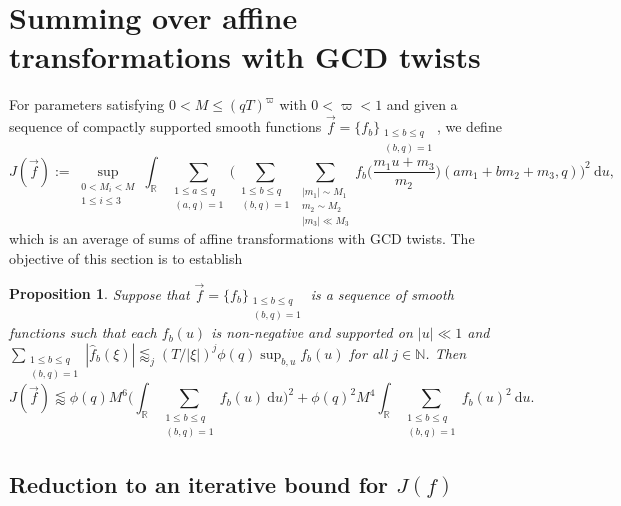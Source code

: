 \documentclass[12pt]{amsart}
\newtheorem{proposition}[theorem]{Proposition}
\theoremstyle{definition}
\theoremstyle{plain}
\theoremstyle{remark}
\numberwithin{equation}{section}
\numberwithin{theorem}{section}
\numberwithin{equation}{section}
\begin{document}
	\section{Summing over affine transformations with GCD twists}\label{sumoaffgcd}
	For parameters satisfying $0<M \leq (qT)^{\varpi}$ with $0<\varpi <1$ and given a sequence of compactly supported smooth functions $\overrightarrow{f}=\{f_{b}\}_{\substack{1 \leq b \leq q \\ (b, q)=1}}$, we define 
	\[J(\overrightarrow{f}):= \sup_{\substack{0<M_{i}< M \\ 1 \leq i \leq 3}} \int_{\mathbb{R}}\sum_{\substack{1 \leq a \leq q \\ (a, q)=1}}
	\bigg(\sum_{\substack{1 \leq b \leq q \\ (b, q)=1}}\sum_{\substack{|m_{1}|\sim M_{1} \\ m_{2}\sim M_{2} \\ |m_{3}|\ll M_{3}}}f_{b}\bigg(\frac{m_{1}u+m_{3}}{m_{2}}\bigg)(am_{1}+bm_{2}+m_{3}, q)\bigg)^{2} \:\mathrm{d}u,\]
	which is an average of sums of affine transformations with GCD twists. The objective of this section is to establish
	\begin{proposition}\label{bsoat}
		Suppose that $\overrightarrow{f}=\{f_{b}\}_{\substack{1 \leq b \leq q \\ (b, q)=1}}$ is a sequence of smooth functions such that each $f_{b}(u)$ is non-negative and supported on $|u|\ll 1$ and $\sum_{\substack{1 \leq b \leq q \\ (b, q)=1}}|\hat{f}_{b}(\xi)| \lessapprox_{j} (T/|\xi|)^{j}\phi(q)\sup_{b,u}f_{b}(u) $ for all $j \in \mathbb{N}$. Then 
		\[J(\overrightarrow{f})\lessapprox \phi(q) M^{6}\bigg(\int_{\mathbb{R}}\sum_{\substack{1 \leq b \leq q \\ (b, q)=1}}f_{b}(u)\:\mathrm{d}u\bigg)^{2}+
		\phi(q)^{2} M^{4}\int_{\mathbb{R}}\sum_{\substack{1 \leq b \leq q \\ (b, q)=1}}f_{b}(u)^{2}\:\mathrm{d}u.\]
	\end{proposition}
	
	\subsection{\texorpdfstring{Reduction to an iterative bound for $J(f)$}
		{Reduction to an iterative bound for J(f)}}\label{redintb}
	
\end{document}
